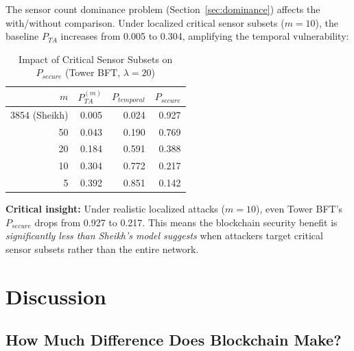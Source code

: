 \documentclass[10pt,twocolumn,letterpaper]{article}
\begin{document}
The sensor count dominance problem (Section~\ref{sec:dominance}) affects the with/without comparison. Under localized critical sensor subsets ($m = 10$), the baseline $P_{TA}$ increases from 0.005 to 0.304, amplifying the temporal vulnerability:

\begin{table}[htbp]
\caption{Impact of Critical Sensor Subsets on $P_{secure}$ (Tower BFT, $\lambda=20$)}
\label{tab:sensor_impact}
\centering
\scriptsize
\begin{tabular}{@{}rrrr@{}}
\toprule
\textbf{$m$} & \textbf{$P_{TA}^{(m)}$} & \textbf{$P_{temporal}$} & \textbf{$P_{secure}$} \\
\midrule
3854 (Sheikh) & 0.005 & 0.024 & 0.927 \\
50 & 0.043 & 0.190 & 0.769 \\
20 & 0.184 & 0.591 & 0.388 \\
10 & 0.304 & 0.772 & 0.217 \\
5  & 0.392 & 0.851 & 0.142 \\
\bottomrule
\end{tabular}
\end{table}

\textbf{Critical insight:} Under realistic localized attacks ($m = 10$), even Tower BFT's $P_{secure}$ drops from 0.927 to 0.217. This means the blockchain security benefit is \emph{significantly less than Sheikh's model suggests} when attackers target critical sensor subsets rather than the entire network.

\section{Discussion}
\label{sec:discussion}

\subsection{How Much Difference Does Blockchain Make?}
\end{document}
